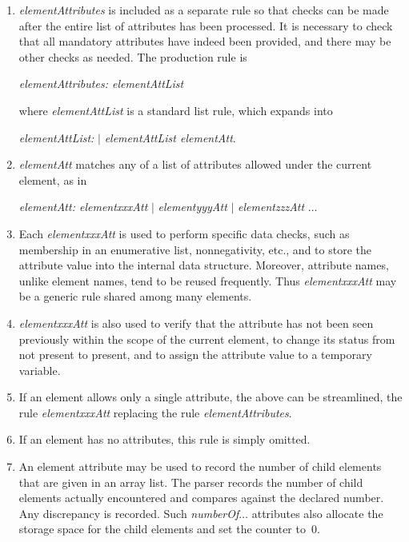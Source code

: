 \begin{enumerate}
\item	{\it elementAttributes\/} is included as a separate rule so that checks can be made after 
the entire list of attributes has been processed. It is necessary to check that all mandatory attributes 
have indeed been provided, and there may be other checks as needed. The production rule is

{\it elementAttributes: elementAttList}

where {\it elementAttList\/} is a standard list rule, which expands into

{\it elementAttList:} $\vert$ {\it elementAttList elementAtt\/}.

\item	{\it elementAtt\/} matches any of a list of attributes allowed under the current element, as in

{\it elementAtt: elementxxxAtt\/} $\vert$ {\it elementyyyAtt} $\vert$ {\it elementzzzAtt} $\ldots$

\item	Each {\it elementxxxAtt\/} is used to perform specific data checks, such as 
membership in an enumerative list, nonnegativity, etc., and to store the attribute value into 
the internal data structure. Moreover, attribute names, unlike element names, tend to be reused frequently. 
Thus {\it elementxxxAtt\/} may be a generic rule shared among many elements. 

\item	{\it elementxxxAtt\/} is also used to verify that the attribute has not been seen previously 
within the scope of the current element, to change its status from not present to present, 
and to assign the attribute value to a temporary variable.

\item	If an element allows only a single attribute, the above can be streamlined, 
the rule {\it elementxxxAtt\/} replacing the rule {\it elementAttributes\/}.

\item	If an element has no attributes, this rule is simply omitted.

\item	An element attribute may be used to record the number of child elements that are given in an array list. 
The parser records the number of child elements actually encountered and compares against the declared number. 
Any discrepancy is recorded. Such {\it numberOf}$\ldots$ attributes also allocate the storage space 
for the child elements and set the counter to~0. 


\end{enumerate}
